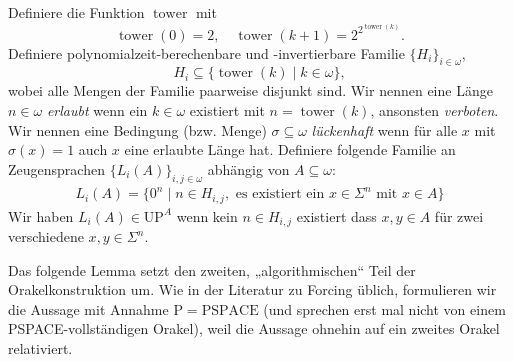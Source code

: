 \documentclass[nofonts]{uebung}
\theoremstyle{definition}
\def\P{\ensuremath{\mathrm{P}}}
\def\UP{\ensuremath{\mathrm{UP}}}
\def\PSPACE{\ensuremath{\mathrm{PSPACE}}}
\DeclareMathOperator{\tower}{tower}
\begin{document}
Definiere die Funktion $\tower$ mit \[ \tower(0)=2, \quad \tower(k+1)=2^{2^{\tower(k)}}. \]
Definiere polynomialzeit-berechenbare und -invertierbare Familie $\{H_{i}\}_{i\in\omega}$, \[ H_i\subseteq\{ \tower(k) \mid k\in\omega \}, \]wobei
alle Mengen der Familie paarweise disjunkt sind.
Wir nennen eine Länge $n\in\omega$ \emph{erlaubt} wenn ein $k\in\omega$ existiert mit $n=\tower(k)$, ansonsten \emph{verboten}.
Wir nennen eine Bedingung (bzw. Menge) $\sigma\subseteq \omega$ \emph{lückenhaft} wenn für alle $x$ mit $\sigma(x)=1$ auch $x$ eine erlaubte Länge hat.
Definiere folgende Familie an Zeugensprachen $\{L_{i}(A) \}_{i,j\in\omega}$ abhängig von $A\subseteq\omega$:
\begin{gather*}
    L_{i}(A) = \{ 0^n \mid n\in H_{i,j}, \text{ es existiert ein $x\in\Sigma^n$ mit $x\in A$} \}
\end{gather*}
Wir haben $L_{i}(A)\in\UP^A$ wenn kein $n\in H_{i,j}$ existiert dass $x, y\in A$ für zwei verschiedene $x,y\in\Sigma^n$.

Das folgende Lemma setzt den zweiten, „algorithmischen“ Teil der Orakelkonstruktion um. Wie in der Literatur zu Forcing üblich, formulieren wir die Aussage mit Annahme $\P=\PSPACE$ (und sprechen erst mal nicht von einem PSPACE-vollständigen Orakel), weil die Aussage ohnehin auf ein zweites Orakel relativiert.
\end{document}
